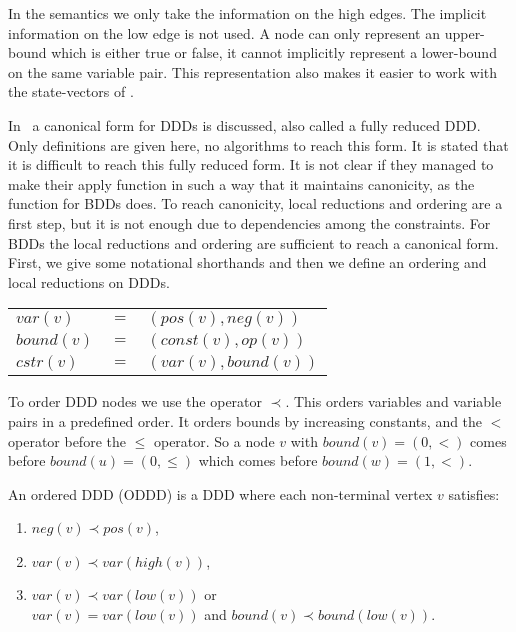In the semantics we only take the information on the high edges. The implicit information on the low edge is not used. A node can only represent an upper-bound which is either true or false, it cannot implicitly represent a lower-bound on the same variable pair. This representation also makes it easier to work with the state-vectors of \ltsmin{}.

In~\cite{ddds} a canonical form for DDDs is discussed, also called a fully reduced DDD. Only definitions are given here, no algorithms to reach this form. It is stated that it is difficult to reach this fully reduced form. It is not clear if they managed to make their apply function in such a way that it maintains canonicity, as the function for BDDs does. To reach canonicity, local reductions and ordering are a first step, but it is not enough due to dependencies among the constraints. For BDDs the local reductions and ordering are sufficient to reach a canonical form. First, we give some notational shorthands and then we define an ordering and local reductions on DDDs.
%
\begin{center}
\begin{tabular}{lll}
$var(v)$   & $=$ & $(pos(v),neg(v))$   \\
$bound(v)$ & $=$ & $(const(v),op(v))$  \\
$cstr(v)$  & $=$ & $(var(v),bound(v))$
\end{tabular}
\end{center}

To order DDD nodes we use the operator $\prec$. This orders variables and variable pairs in a predefined order. It orders bounds by increasing constants, and the $<$ operator before the $\leq$ operator. So a node $v$ with $bound(v) = (0,<)$ comes before $bound(u) = (0,\leq)$ which comes before $bound(w) = (1,<)$.

\begin{mydef}
\label{def:ODDD}
An ordered DDD (ODDD) is a DDD where each non-terminal vertex $v$ satisfies:
\begin{enumerate}
  \item $neg(v) \prec pos(v)$,
  \item $var(v) \prec var(high(v))$,
  \item $var(v) \prec var(low(v))$ or \\ $var(v) = var(low(v))$ and $bound(v) \prec bound(low(v))$.
\end{enumerate}
\end{mydef}

